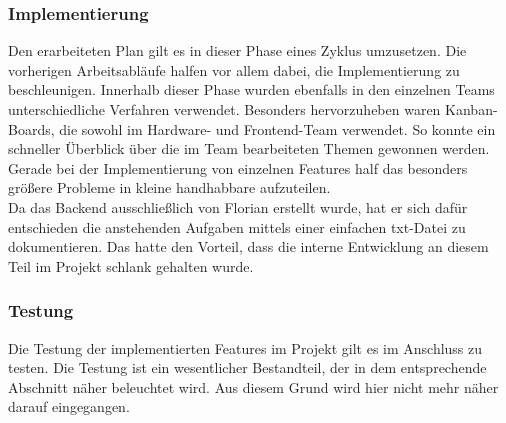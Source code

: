         \subsubsection*{Implementierung}
            Den erarbeiteten Plan gilt es in dieser Phase eines Zyklus umzusetzen. Die vorherigen 
            Arbeitsabläufe halfen vor allem dabei, die Implementierung zu beschleunigen. Innerhalb dieser Phase 
            wurden ebenfalls in den einzelnen Teams unterschiedliche Verfahren verwendet. Besonders hervorzuheben 
            waren Kanban-Boards, die sowohl im Hardware- und Frontend-Team verwendet. So konnte ein schneller 
            Überblick über die im Team bearbeiteten Themen gewonnen werden. Gerade bei der Implementierung von 
            einzelnen Features half das besonders größere Probleme in kleine handhabbare aufzuteilen. \\
            Da das Backend ausschließlich von Florian erstellt wurde, hat er sich dafür entschieden die anstehenden 
            Aufgaben mittels einer einfachen txt-Datei zu dokumentieren. Das hatte den Vorteil, dass die interne 
            Entwicklung an diesem Teil im Projekt schlank gehalten wurde. \\

        \subsubsection*{Testung}
            Die Testung der implementierten Features im Projekt gilt es im Anschluss zu testen. Die Testung ist ein 
            wesentlicher Bestandteil, der in dem entsprechende Abschnitt näher beleuchtet wird. Aus diesem Grund 
            wird hier nicht mehr näher darauf eingegangen. 

